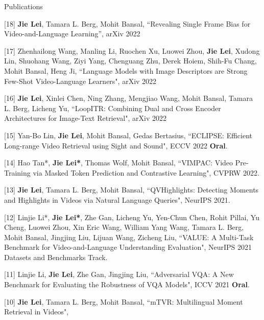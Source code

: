 \documentclass{resume} %
\begin{document}
\begin{rSection}{Publications}          
    \item {[18] 
    \textbf{Jie Lei}, Tamara L. Berg, Mohit Bansal,
    ``Revealing Single Frame Bias for Video-and-Language Learning'',
     arXiv 2022
    }        
    \item {[17] 
    Zhenhailong Wang, Manling Li, Ruochen Xu, Luowei Zhou,  \textbf{Jie Lei}, Xudong Lin, Shuohang Wang, Ziyi Yang, Chenguang Zhu, Derek Hoiem, Shih-Fu Chang, Mohit Bansal, Heng Ji,
    ``Language Models with Image Descriptors are Strong Few-Shot Video-Language Learners",
     arXiv 2022
    }  
    \item {[16] 
    \textbf{Jie Lei}, Xinlei Chen, Ning Zhang, Mengjiao Wang, Mohit Bansal, Tamara L. Berg, Licheng Yu,
    ``LoopITR: Combining Dual and Cross Encoder Architectures for Image-Text Retrieval", 
    arXiv 2022
    }         
    \item {[15] 
    Yan-Bo Lin, \textbf{Jie Lei}, Mohit Bansal, Gedas Bertasius,
    ``ECLIPSE: Efficient Long-range Video Retrieval using Sight and Sound",
     ECCV 2022 {\color{bittersweet}\textbf{Oral}}. 
    }              
    \item {[14] Hao Tan*, \textbf{Jie Lei*}, Thomas Wolf, Mohit Bansal,
            ``VIMPAC: Video Pre-Training via Masked Token Prediction and Contrastive Learning",
            CVPRW 2022.
            }         
    \item {[13] \textbf{Jie Lei}, Tamara L. Berg, Mohit Bansal,
            ``QVHighlights: Detecting Moments and Highlights in Videos via Natural Language Queries",
            NeurIPS 2021.
            }              
    \item {[12] Linjie Li*, \textbf{Jie Lei*}, Zhe Gan, Licheng Yu, Yen-Chun Chen, Rohit Pillai, Yu Cheng, Luowei Zhou, Xin Eric Wang, William Yang Wang, Tamara L. Berg, Mohit Bansal, Jingjing Liu, Lijuan Wang, Zicheng Liu,
            ``VALUE: A Multi-Task Benchmark for Video-and-Language Understanding Evaluation",
            NeurIPS 2021 Datasets and Benchmarks Track. 
            }            
    \item {[11] Linjie Li, \textbf{Jie Lei}, Zhe Gan, Jingjing Liu,
            ``Adversarial VQA: A New Benchmark for Evaluating the Robustness of VQA Models",
            ICCV 2021 {\color{bittersweet}\textbf{Oral}}. 
            }              
    \item {[10] \textbf{Jie Lei}, Tamara L. Berg, Mohit Bansal,
            ``mTVR: Multilingual Moment Retrieval in Videos",
}
\end{rSection}
\end{document}
